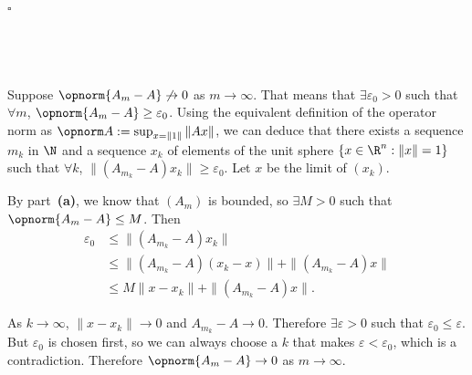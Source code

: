 \documentclass[a4paper]{article}
\begin{document}
\hfill $\square$

\subsection{~} %


Suppose $\opnorm{A_m - A} \not\to 0$ as $m \to \infty$. That means that $\exists \varepsilon_0 > 0$ such that $\forall m$, $\opnorm{A_m - A} \ge \varepsilon_0$. Using the equivalent definition of the operator norm as $\opnorm A := \sup_{x = \| 1 \|} \| Ax \|$, we can deduce that there exists a sequence $m_k$ in $\N$ and a sequence $x_k$ of elements of the unit sphere $\{ x \in \R^n : \| x \| = 1 \}$ such that $\forall k$, $\| (A_{m_k} - A) x_k \| \ge \varepsilon_0$. Let $x$ be the limit of $(x_k)$.

By part~\textbf{(a)}, we know that $(A_m)$ is bounded, so $\exists M > 0$ such that $\opnorm{A_m - A} \le M$. Then
\begin{align*}
\varepsilon_0 &\le \| (A_{m_k} - A) x_k \| \\[0.5ex]
&\le \| (A_{m_k} - A) (x_k - x) \| + \| (A_{m_k} - A) x \| \\[0.5ex]
&\le M \| x - x_k \| + \| (A_{m_k} - A) x \|.
\end{align*}

As $k \to \infty$, $\| x - x_k \| \to 0$ and $A_{m_k} - A \to 0$. Therefore $\exists \varepsilon > 0$ such that $\varepsilon_0 \le \varepsilon$. But $\varepsilon_0$ is chosen first, so we can always choose a $k$ that makes $\varepsilon < \varepsilon_0$, which is a contradiction.
Therefore $\opnorm{A_m - A} \to 0$ as $m \to \infty$.
\end{document}
